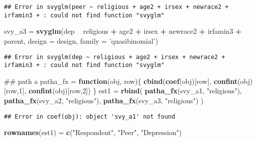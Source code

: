 \documentclass[]{article}
\newenvironment{Shaded}{\begin{snugshade}}{\end{snugshade}}
\newcommand{\KeywordTok}[1]{\textcolor[rgb]{0.13,0.29,0.53}{\textbf{#1}}}
\newcommand{\DataTypeTok}[1]{\textcolor[rgb]{0.13,0.29,0.53}{#1}}
\newcommand{\DecValTok}[1]{\textcolor[rgb]{0.00,0.00,0.81}{#1}}
\newcommand{\StringTok}[1]{\textcolor[rgb]{0.31,0.60,0.02}{#1}}
\newcommand{\ControlFlowTok}[1]{\textcolor[rgb]{0.13,0.29,0.53}{\textbf{#1}}}
\newcommand{\OperatorTok}[1]{\textcolor[rgb]{0.81,0.36,0.00}{\textbf{#1}}}
\newcommand{\NormalTok}[1]{#1}
\begin{document}
\begin{verbatim}
## Error in svyglm(peer ~ religious + age2 + irsex + newrace2 + irfamin3 + : could not find function "svyglm"
\end{verbatim}

\begin{Shaded}
\begin{Highlighting}[]
\NormalTok{svy_a3 =}\StringTok{ }\KeywordTok{svyglm}\NormalTok{(dep }\OperatorTok{~}\StringTok{ }\NormalTok{religious }\OperatorTok{+}\StringTok{ }\NormalTok{age2 }\OperatorTok{+}\StringTok{ }
\StringTok{                  }\NormalTok{irsex }\OperatorTok{+}\StringTok{ }\NormalTok{newrace2 }\OperatorTok{+}\StringTok{ }\NormalTok{irfamin3 }\OperatorTok{+}\StringTok{ }\NormalTok{parent, }
                \DataTypeTok{design =}\NormalTok{ design, }
                \DataTypeTok{family =} \StringTok{'quasibinomial'}\NormalTok{)}
\end{Highlighting}
\end{Shaded}

\begin{verbatim}
## Error in svyglm(dep ~ religious + age2 + irsex + newrace2 + irfamin3 + : could not find function "svyglm"
\end{verbatim}

\begin{Shaded}
\begin{Highlighting}[]
\NormalTok{## path a}
\NormalTok{patha_fx =}\StringTok{ }\ControlFlowTok{function}\NormalTok{(obj, row)\{}
  \KeywordTok{cbind}\NormalTok{(}\KeywordTok{coef}\NormalTok{(obj)[row], }
            \KeywordTok{confint}\NormalTok{(obj)[row,}\DecValTok{1}\NormalTok{], }
            \KeywordTok{confint}\NormalTok{(obj)[row,}\DecValTok{2}\NormalTok{])}
\NormalTok{\}}
\NormalTok{est1 =}\StringTok{ }
\StringTok{  }\KeywordTok{rbind}\NormalTok{(}
    \KeywordTok{patha_fx}\NormalTok{(svy_a1, }\StringTok{"religious"}\NormalTok{),}
    \KeywordTok{patha_fx}\NormalTok{(svy_a2, }\StringTok{"religious"}\NormalTok{),}
    \KeywordTok{patha_fx}\NormalTok{(svy_a3, }\StringTok{"religious"}\NormalTok{)}
\NormalTok{)}
\end{Highlighting}
\end{Shaded}

\begin{verbatim}
## Error in coef(obj): object 'svy_a1' not found
\end{verbatim}

\begin{Shaded}
\begin{Highlighting}[]
\KeywordTok{rownames}\NormalTok{(est1) =}\StringTok{ }\KeywordTok{c}\NormalTok{(}\StringTok{"Respondent"}\NormalTok{, }\StringTok{"Peer"}\NormalTok{, }\StringTok{"Depression"}\NormalTok{)}
\end{Highlighting}
\end{Shaded}
\end{document}
